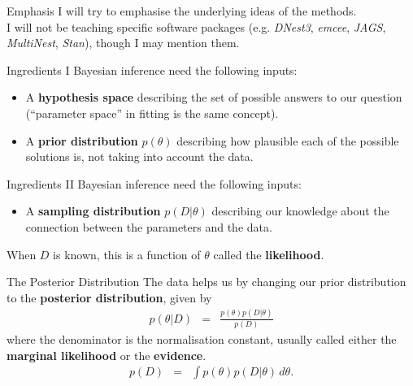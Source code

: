 \begin{frame}[t]{Emphasis}
I will try to emphasise the underlying ideas of the methods.\\
I will not
be teaching specific software packages
(e.g. {\it DNest3}, {\it emcee}, {\it JAGS}, {\it MultiNest}, {\it Stan}),
though I may mention them.
\end{frame}

\begin{frame}[t]{Ingredients I}
Bayesian inference need the following inputs:

\begin{itemize}
\setlength{\itemsep}{20pt}
\item A {\bf hypothesis space} describing the set of possible answers to our
question (``parameter space'' in fitting is the same concept).
\item A {\bf prior distribution} $p(\theta)$ describing how plausible
each of the possible solutions is, not taking into account the data.
\end{itemize}
\end{frame}

\begin{frame}[t]{Ingredients II}
Bayesian inference need the following inputs:
\begin{itemize}
\item A {\bf sampling distribution} $p(D | \theta)$ describing our knowledge
about the connection between the parameters and the data.
\end{itemize}

When $D$ is known,
this is a function of $\theta$ called the {\bf likelihood}.
\end{frame}


\begin{frame}[t]{The Posterior Distribution}
The data helps us by changing our prior distribution to the {\bf posterior
distribution}, given by
\begin{eqnarray*}
p(\theta | D) &=& \frac{p(\theta) p(D|\theta)}{p(D)}
\end{eqnarray*}
where the denominator is the normalisation constant, usually called either
the {\bf marginal likelihood} or the {\bf evidence}.
\begin{eqnarray*}
p(D) &=& \int p(\theta)p(D|\theta) \, d\theta.
\end{eqnarray*}

\end{frame}

